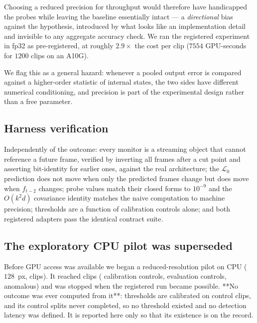 Choosing a reduced precision for throughput would therefore have handicapped the
probes while leaving the baseline essentially intact --- a \emph{directional}
bias against the hypothesis, introduced by what looks like an implementation
detail and invisible to any aggregate accuracy check. We ran the registered
experiment in fp32 as pre-registered, at roughly $2.9\times$ the cost per clip
($7554$ GPU-seconds for $1200$ clips on an A10G).

We flag this as a general hazard: whenever a pooled output error is compared
against a higher-order statistic of internal states, the two sides have
different numerical conditioning, and precision is part of the experimental
design rather than a free parameter.

\begin{table}[t]
\centering
\small

\caption{Relative error against fp32 on the real pretrained weights, measured
on the monitor values themselves. Spearman is rank correlation with the fp32
ordering. The loss is robust; the geometry probes are not.}
\label{tab:precision}
\end{table}

\subsection{Harness verification}

Independently of the outcome: every monitor is a streaming object that cannot
reference a future frame, verified by inverting all frames after a cut point and
asserting bit-identity for earlier ones, against the real architecture; the
$\mathcal{L}_0$ prediction does not move when only the predicted frames change
but does move when $f_{t-2}$ changes; probe values match their closed forms to
$10^{-9}$ and the $O(k^2d)$ covariance identity matches the naive computation to
machine precision; thresholds are a function of calibration controls alone; and
both registered adapters pass the identical contract suite.

\subsection{The exploratory CPU pilot was superseded}
\label{sec:pilot}

Before GPU access was available we began a reduced-resolution pilot on CPU
($128$~px, \lgwPilotTarget{} clips). It reached \lgwPilotTotal{} clips
(\lgwPilotCalib{} calibration controls, \lgwPilotEval{} evaluation controls,
\lgwPilotAnom{} anomalous) and was stopped when the registered run became
possible. **No outcome was ever computed from it**: thresholds are calibrated on
control clips, and its control splits never completed, so no threshold existed
and no detection latency was defined. It is reported here only so that its
existence is on the record.
